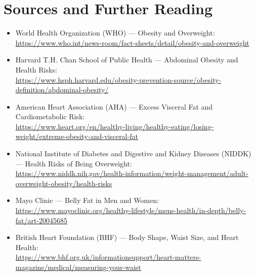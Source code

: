 \section*{Sources and Further Reading}
\begin{itemize}
    \item World Health Organization (WHO) — Obesity and Overweight: \\ \url{https://www.who.int/news-room/fact-sheets/detail/obesity-and-overweight}
    \item Harvard T.H. Chan School of Public Health — Abdominal Obesity and Health Risks: \\ \url{https://www.hsph.harvard.edu/obesity-prevention-source/obesity-definition/abdominal-obesity/}
    \item American Heart Association (AHA) — Excess Visceral Fat and Cardiometabolic Risk: \\ \url{https://www.heart.org/en/healthy-living/healthy-eating/losing-weight/extreme-obesity-and-visceral-fat}
    \item National Institute of Diabetes and Digestive and Kidney Diseases (NIDDK) — Health Risks of Being Overweight: \\ \url{https://www.niddk.nih.gov/health-information/weight-management/adult-overweight-obesity/health-risks}
    \item Mayo Clinic — Belly Fat in Men and Women: \\ \url{https://www.mayoclinic.org/healthy-lifestyle/mens-health/in-depth/belly-fat/art-20045685}
    \item British Heart Foundation (BHF) — Body Shape, Waist Size, and Heart Health: \\ \url{https://www.bhf.org.uk/informationsupport/heart-matters-magazine/medical/measuring-your-waist}
\end{itemize}